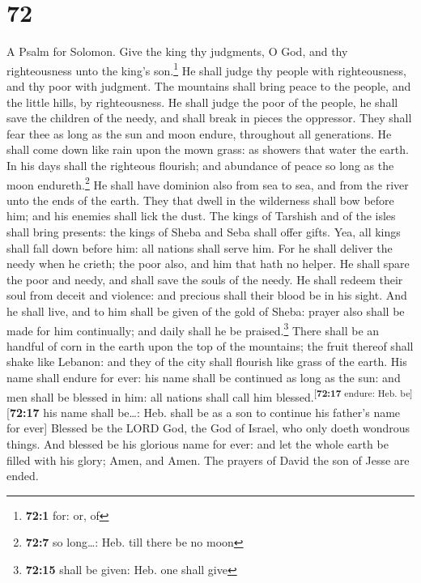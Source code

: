 \hypertarget{section-71}{%
\section{72}\label{section-71}}

A Psalm for Solomon.  Give the king thy judgments, O God,
and thy righteousness unto the king's son.\footnote{\textbf{72:1} for:
  or, of}  He shall judge thy people with righteousness,
and thy poor with judgment.  The mountains shall bring
peace to the people, and the little hills, by righteousness.
 He shall judge the poor of the people, he shall save the
children of the needy, and shall break in pieces the oppressor.
 They shall fear thee as long as the sun and moon endure,
throughout all generations.  He shall come down like rain
upon the mown grass: as showers that water the earth.  In
his days shall the righteous flourish; and abundance of peace so long as
the moon endureth.\footnote{\textbf{72:7} so long\ldots: Heb. till there
  be no moon}  He shall have dominion also from sea to
sea, and from the river unto the ends of the earth.  They
that dwell in the wilderness shall bow before him; and his enemies shall
lick the dust.  The kings of Tarshish and of the isles
shall bring presents: the kings of Sheba and Seba shall offer gifts.
 Yea, all kings shall fall down before him: all nations
shall serve him.  For he shall deliver the needy when he
crieth; the poor also, and him that hath no helper.  He
shall spare the poor and needy, and shall save the souls of the needy.
 He shall redeem their soul from deceit and violence: and
precious shall their blood be in his sight.  And he shall
live, and to him shall be given of the gold of Sheba: prayer also shall
be made for him continually; and daily shall he be praised.\footnote{\textbf{72:15}
  shall be given: Heb. one shall give}  There shall be an
handful of corn in the earth upon the top of the mountains; the fruit
thereof shall shake like Lebanon: and they of the city shall flourish
like grass of the earth.  His name shall endure for ever:
his name shall be continued as long as the sun: and men shall be blessed
in him: all nations shall call him
blessed.\textsuperscript{{[}\textbf{72:17} endure: Heb.
be{]}}{[}\textbf{72:17} his name shall be\ldots: Heb. shall be as a son
to continue his father's name for ever{]}  Blessed be the
LORD God, the God of Israel, who only doeth wondrous things.
 And blessed be his glorious name for ever: and let the
whole earth be filled with his glory; Amen, and Amen. 
The prayers of David the son of Jesse are ended.

